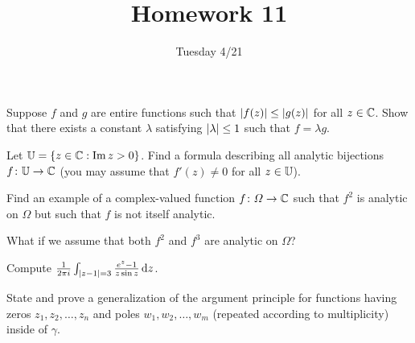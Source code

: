 \documentclass {../math135}
\title {Homework 11}
\date {Tuesday 4/21}
\author {}
\begin{document}
\begin {exercise}
	Suppose \(f\) and \(g\) are entire functions such that
  \(\lvert f(z)\rvert \le \lvert g(z)\rvert\) for all \(z \in \mathbb C\).  Show that
  there exists a constant \(\lambda\) satisfying
  \(\lvert\lambda\rvert \le 1\) such that \(f = \lambda g\).

  \begin {solution}

  \end {solution}

\end {exercise}

\begin {exercise}
	Let \(\mathbb U = \{z \in \mathbb C : \operatorname{Im} z > 0\}\).  Find a formula
  describing all analytic bijections \(f \colon \mathbb U \to \mathbb C\) (you may
  assume that \(f'(z) \ne 0\) for all \(z \in \mathbb U\)).

  \begin {solution}

  \end {solution}

\end {exercise}

\begin {exercise}
  \begin {problems}
  \item Find an example of a complex-valued function
    \(f \colon \Omega \to \mathbb C\) such that \(f^2\) is analytic on
    \(\Omega\) but such that \(f\) is not itself analytic.

    \begin {solution}

    \end {solution}

  \item What if we assume that both \(f^2\) and \(f^3\) are analytic
    on \(\Omega\)?

    \begin {solution}

    \end {solution}

  \end {problems}
\end {exercise}

\begin {exercise}
	Compute
  \(\frac 1 {2 \pi i} \int_{\lvert z-1\rvert = 3} \frac {e^z - 1} {z \sin z}
  \mathop{}\!\mathrm d z\).

  \begin {solution}

  \end {solution}

\end {exercise}

\begin {exercise}
	State and prove a generalization of the argument principle for
  functions having zeros \(z_1, z_2, \dots, z_n\) and poles
  \(w_1, w_2, \dots, w_m\) (repeated according to multiplicity) inside
  of \(\gamma\).

  \begin {solution}

  \end {solution}

\end {exercise}
\end{document}
